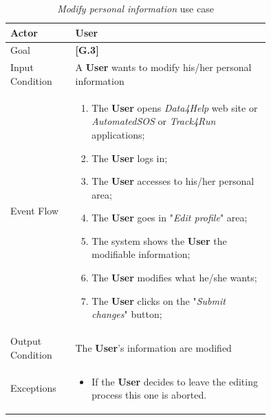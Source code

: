 \begin{center}
\begin{table}
\begin{tabular}{ | l | p{0.75\linewidth} | }
  \hline
    Actor & \textbf{User} \\ \hline
    Goal & \textbf{[G.3]} \\ \hline
    Input Condition & A \textbf{User} wants to modify his/her personal information\\ \hline
    Event Flow & \begin{minipage}[t]{0.7\textwidth}
      \begin{enumerate}
        \item The \textbf{User} opens \textit{Data4Help} web site or \textit{AutomatedSOS} or \textit{Track4Run} applications;
        \item The \textbf{User} logs in;
        \item The \textbf{User} accesses to his/her personal area;
        \item The \textbf{User} goes in "\textit{Edit profile}" area;
        \item The system shows the \textbf{User} the modifiable information;
        \item The \textbf{User} modifies what he/she wants;
        \item The \textbf{User} clicks on the "\textit{Submit changes}" button;
      \end{enumerate}
    \smallskip
  \end{minipage} \\ \hline
  Output Condition & The \textbf{User}'s information are modified\\ \hline
  Exceptions & \begin{minipage}[t]{0.7\textwidth}
    \begin{itemize}
      \smallskip
      \item If the \textbf{User} decides to leave the editing process this one is aborted.
    \end{itemize}
    \smallskip
  \end{minipage}  \\ \hline
\end{tabular}
\caption{\textit{Modify personal information} use case}
\label{table:modifyPersonalInformationTable}
\end{table}
\end{center}

